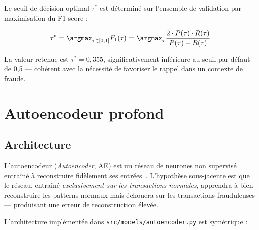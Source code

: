 \documentclass[12pt,a4paper,twoside]{report}
\theoremstyle{definition}
\begin{document}
Le seuil de décision optimal $\tau^*$ est déterminé sur l'ensemble de validation
par maximisation du F1-score :

\begin{equation}
\tau^* = \argmax_{\tau \in [0,1]}
  F_1(\tau) = \argmax_{\tau}
  \frac{2 \cdot P(\tau) \cdot R(\tau)}{P(\tau) + R(\tau)}
\label{eq:optimal_threshold}
\end{equation}

La valeur retenue est $\tau^* = 0{,}355$, significativement inférieure au
seuil par défaut de 0,5 — cohérent avec la nécessité de favoriser le rappel
dans un contexte de fraude.

\section{Autoencodeur profond}

\subsection{Architecture}

L'autoencodeur (\textit{Autoencoder}, AE) est un réseau de neurones non supervisé
entraîné à reconstruire fidèlement ses entrées~\cite{vincent2010stacked}.
L'hypothèse sous-jacente est que le réseau, entraîné \emph{exclusivement sur les
transactions normales}, apprendra à bien reconstruire les patterns normaux mais
échouera sur les transactions frauduleuses — produisant une erreur de reconstruction
élevée.

L'architecture implémentée dans \texttt{src/models/autoencoder.py} est symétrique :
\end{document}
